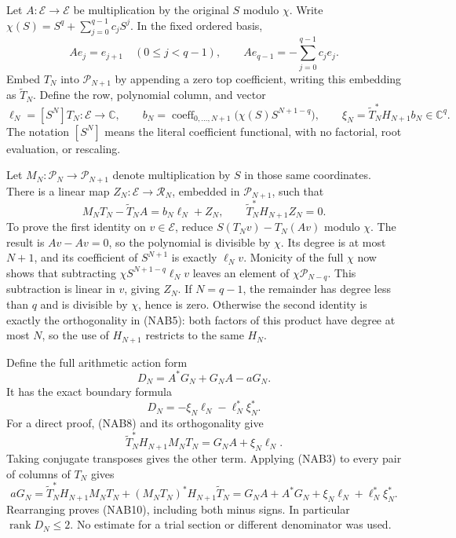 Let \(A:\mathcal E\to\mathcal E\) be multiplication by the original \(S\)
modulo \(\chi\).  Write
\(\chi(S)=S^q+\sum_{j=0}^{q-1}c_jS^j\).
In the fixed ordered basis,
\begin{equation}
 A e_j=e_{j+1}\quad(0\leq j<q-1),\qquad
 A e_{q-1}=-\sum_{j=0}^{q-1}c_je_j .
 \tag{NAB6}\label{eq:NAB6}
\end{equation}
Embed \(T_N\) into \(\mathcal P_{N+1}\) by appending a zero top
coefficient, writing this embedding as \(\widetilde T_N\).
Define the row, polynomial column, and vector
\begin{equation}
 \ell_N=[S^N]T_N:\mathcal E\longrightarrow\mathbb C,\qquad
 b_N=\operatorname{coeff}_{0,\ldots,N+1}
             \bigl(\chi(S)S^{N+1-q}\bigr),\qquad
 \xi_N=\widetilde T_N^*H_{N+1}b_N\in\mathbb C^q .
 \tag{NAB7}\label{eq:NAB7}
\end{equation}
The notation \([S^N]\) means the literal coefficient functional, with no
factorial, root evaluation, or rescaling.

Let \(M_N:\mathcal P_N\to\mathcal P_{N+1}\) denote multiplication by \(S\)
in those same coordinates.  There is a linear map
\(Z_N:\mathcal E\to\mathcal R_N\), embedded in \(\mathcal P_{N+1}\),
such that
\begin{equation}
 M_NT_N-\widetilde T_N A=b_N\ell_N+Z_N,\qquad
 \widetilde T_N^*H_{N+1}Z_N=0.
 \tag{NAB8}\label{eq:NAB8}
\end{equation}
To prove the first identity on \(v\in\mathcal E\), reduce
\(S(T_Nv)-T_N(Av)\) modulo \(\chi\).
The result is \(Av-Av=0\), so the polynomial is divisible by \(\chi\).
Its degree is at most \(N+1\), and its coefficient of \(S^{N+1}\) is
exactly \(\ell_Nv\).  Monicity of the full \(\chi\) now shows that
subtracting \(\chi S^{N+1-q}\ell_Nv\) leaves an element of
\(\chi\mathcal P_{N-q}\).
This subtraction is linear in \(v\), giving \(Z_N\).
If \(N=q-1\), the remainder has degree less than \(q\) and is divisible
by \(\chi\), hence is zero.
Otherwise the second identity is exactly the orthogonality in (NAB5):
both factors of this product have degree at most \(N\), so the use of
\(H_{N+1}\) restricts to the same \(H_N\).

Define the full arithmetic action form
\begin{equation}
 D_N=A^*G_N+G_NA-aG_N .
 \tag{NAB9}\label{eq:NAB9}
\end{equation}
It has the exact boundary formula
\begin{equation}
 \boxed{\displaystyle
 D_N=-\xi_N\ell_N-\ell_N^*\xi_N^*.}
 \tag{NAB10}\label{eq:NAB10}
\end{equation}
For a direct proof, (NAB8) and its orthogonality give
\[
 \widetilde T_N^*H_{N+1}M_NT_N
       =G_NA+\xi_N\ell_N .
\]
Taking conjugate transposes gives the other term.
Applying (NAB3) to every pair of columns of \(T_N\) gives
\[
 aG_N=
 \widetilde T_N^*H_{N+1}M_NT_N+
 (M_NT_N)^*H_{N+1}\widetilde T_N
 =G_NA+A^*G_N+\xi_N\ell_N+\ell_N^*\xi_N^*.
\]
Rearranging proves (NAB10), including both minus signs.
In particular \(\operatorname{rank}D_N\leq2\).
No estimate for a trial section or different denominator was used.

